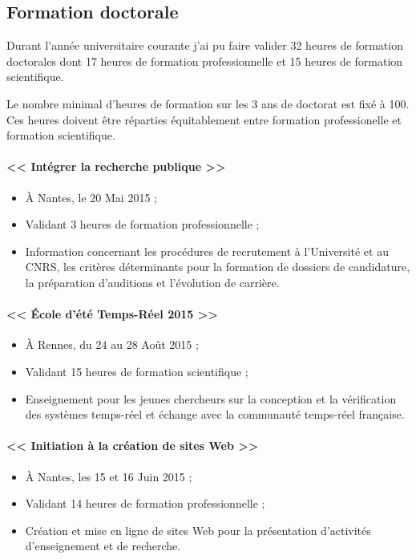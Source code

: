   \subsection{Formation doctorale}

    Durant l'année universitaire courante j'ai pu faire valider 32 heures de
    formation doctorales dont 17 heures de formation professionnelle et 15
    heures de formation scientifique.

    Le nombre minimal d'heures de formation sur les 3 ans de doctorat est fixé à
    100. Ces heures doivent être réparties équitablement entre formation
    professionelle et formation scientifique.
  
    \paragraph{<< Intégrer la recherche publique >>}
    { \begin{itemize}
        \item À Nantes, le 20 Mai 2015 ;
        \item Validant 3 heures de formation professionnelle ;
        \item Information concernant les procédures de recrutement à
          l'Université et au CNRS, les critères déterminants pour la formation
          de dossiers de candidature, la préparation d'auditions et l'évolution
          de carrière.
      \end{itemize} }

    \paragraph{<< École d'été Temps-Réel 2015 >>}
    { \begin{itemize}
        \item À Rennes, du 24 au 28 Août 2015 ;
        \item Validant 15 heures de formation scientifique ;
        \item Enseignement pour les jeunes chercheurs sur la conception et la
          vérification des systèmes temps-réel et échange avec la communauté
          temps-réel française.
      \end{itemize} }
  
    \paragraph{<< Initiation à la création de sites Web >>}
    { \begin{itemize}
        \item À Nantes, les 15 et 16 Juin 2015 ;
        \item Validant 14 heures de formation professionnelle ;
        \item Création et mise en ligne de sites Web pour la présentation
          d'activités d’enseignement et de recherche.
      \end{itemize} }
